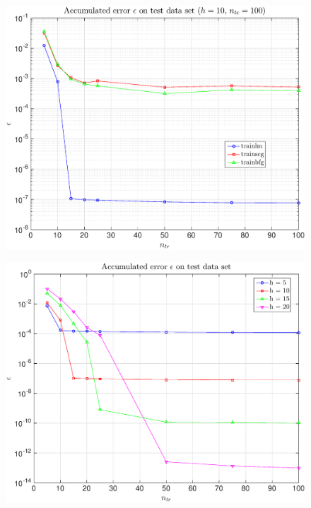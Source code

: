 \documentclass[11pt,a4paper]{article}
\theoremstyle{definition}
\theoremstyle{theorem}
\numberwithin{equation}{section}
\begin{document}
	\begin{figure}[H]
		\center
		\includegraphics[scale = 0.5]{fig26}
		\caption{}
	\end{figure}
	
	\begin{figure}[H]
		\center
		\includegraphics[scale = 0.5]{fig27}
		\caption{}
	\end{figure}
	
\end{document}
